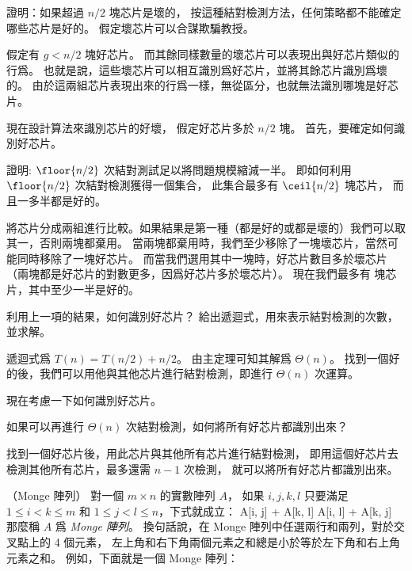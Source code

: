 \startigBase[a]
\item 證明：如果超過 $n/2$ 塊芯片是壞的，
按這種結對檢測方法，任何策略都不能確定哪些芯片是好的。
假定壞芯片可以合謀欺騙教授。

\startANSWER
假定有 $g < n/2$ 塊好芯片。
而其餘同樣數量的壞芯片可以表現出與好芯片類似的行爲。
也就是說，這些壞芯片可以相互識別爲好芯片，並將其餘芯片識別爲壞的。
由於這兩組芯片表現出來的行爲一樣，無從區分，也就無法識別哪塊是好芯片。
\stopANSWER

現在設計算法來識別芯片的好壞，
假定好芯片多於 $n/2$ 塊。
首先，要確定如何識別好芯片。

\item 證明:
$\floor{n/2}$ 次結對測試足以將問題規模縮減一半。
即如何利用 $\floor{n/2}$ 次結對檢測獲得一個集合，
此集合最多有 $\ceil{n/2}$ 塊芯片，
而且一多半都是好的。

\startANSWER
將芯片分成兩組進行比較。如果結果是第一種（都是好的或都是壞的）我們可以取其一，否則兩塊都棄用。
當兩塊都棄用時，我們至少移除了一塊壞芯片，當然可能同時移除了一塊好芯片。
而當我們選用其中一塊時，好芯片數目多於壞芯片（兩塊都是好芯片的對數更多，因爲好芯片多於壞芯片）。
現在我們最多有  塊芯片，其中至少一半是好的。
\stopANSWER

\item 利用上一項的結果，如何識別好芯片？
給出遞迴式，用來表示結對檢測的次數，並求解。

\startANSWER
遞迴式爲 $T(n) = T(n/2) + n/2$。
由主定理可知其解爲 $\Theta(n)$。
找到一個好的後，我們可以用他與其他芯片進行結對檢測，即進行 $\Theta(n)$ 次運算。
\stopANSWER

現在考慮一下如何識別好芯片。

\startitem
如果可以再進行 $\Theta(n)$ 次結對檢測，如何將所有好芯片都識別出來？
\stopitem

\startANSWER
找到一個好芯片後，用此芯片與其他所有芯片進行結對檢測，
即用這個好芯片去檢測其他所有芯片，最多還需 $n-1$ 次檢測，
就可以將所有好芯片都識別出來。
\stopANSWER

\stopigBase
\stopPROBLEM

\startPROBLEM（Monge 陣列）
對一個 $m\times n$ 的實數陣列 $A$，
如果 $i,j,k,l$ 只要滿足 $1\le i < k \le m$ 和 $1\le j < l \le n$，下式就成立：
\startformula
A[i, j] + A[k, l] \le A[i, l] + A[k, j]
\stopformula
那麼稱 $A$ 爲 \emph{Monge 陣列}。
換句話說，在 Monge 陣列中任選兩行和兩列，對於交叉點上的 4 個元素，
左上角和右下角兩個元素之和總是小於等於左下角和右上角元素之和。
例如，下面就是一個 Monge 陣列：
\startsplitformula\startmatrix
{}     \NR
{}     \NR
{}     \NR
{}     \NR
{}     \NR
{}     \NR
{}     \NR
\stopmatrix\stopsplitformula

